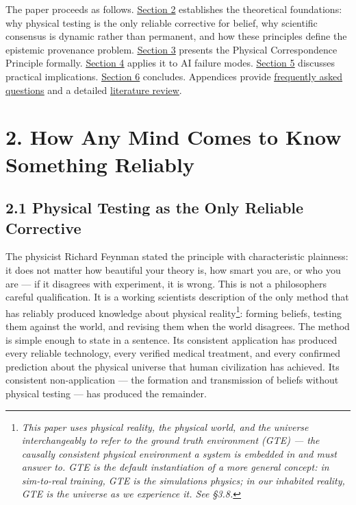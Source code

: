 \documentclass[
]{article}
\begin{document}
The paper proceeds as follows.
\hyperref[how-any-mind-comes-to-know-something-reliably]{\ul{Section 2}}
establishes the theoretical foundations: why physical testing is the
only reliable corrective for belief, why scientific consensus is dynamic
rather than permanent, and how these principles define the epistemic
provenance problem.
\hyperref[the-physical-correspondence-principle]{\ul{Section 3}}
presents the Physical Correspondence Principle formally.
\hyperref[what-goes-wrong-when-physical-grounding-is-lost]{\ul{Section
4}} applies it to AI failure modes.
\hyperref[practical-implications]{\ul{Section 5}} discusses practical
implications. \hyperref[conclusion]{\ul{Section 6}} concludes.
Appendices provide
\hyperref[appendix-a-frequently-asked-questions-and-anticipated-objections]{\ul{frequently
asked questions}} and a detailed
\hyperref[appendix-b-related-work]{\ul{literature review}}.

\section{2. How Any Mind Comes to Know Something
Reliably}\label{how-any-mind-comes-to-know-something-reliably}

\subsection{2.1 Physical Testing as the Only Reliable
Corrective}\label{physical-testing-as-the-only-reliable-corrective}

The physicist Richard Feynman stated the principle with characteristic
plainness: it does not matter how beautiful your theory is, how smart
you are, or who you are --- if it disagrees with experiment, it is
wrong. This is not a philosopher\textquotesingle s careful
qualification. It is a working scientist\textquotesingle s description
of the only method that has reliably produced knowledge about physical
reality\footnote{\emph{This paper uses \textquotesingle physical
  reality\textquotesingle, \textquotesingle the physical
  world\textquotesingle, and \textquotesingle the
  universe\textquotesingle{} interchangeably to refer to the ground
  truth environment (GTE) --- the causally consistent physical
  environment a system is embedded in and must answer to. GTE is the
  default instantiation of a more general concept: in sim-to-real
  training, GTE is the simulation\textquotesingle s physics; in our
  inhabited reality, GTE is the universe as we experience it. See §3.8.}}:
forming beliefs, testing them against the world, and revising them when
the world disagrees. The method is simple enough to state in a sentence.
Its consistent application has produced every reliable technology, every
verified medical treatment, and every confirmed prediction about the
physical universe that human civilization has achieved. Its consistent
non-application --- the formation and transmission of beliefs without
physical testing --- has produced the remainder.
\end{document}
